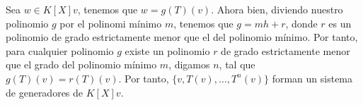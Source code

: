 Sea \(w \in K[X]v\), tenemos que  \(w = g(T)(v)\). Ahora bien, diviendo nuestro polinomio  \(g\) por el polinomi mínimo  \(m\), tenemos que  \(g = mh + r\), donde \(r\) es un polinomio de grado estrictamente menor que el del polinomio mínimo. Por tanto, para cualquier polinomio \(g\) existe un polinomio \(r\) de grado estrictamente menor que el grado del polinomio mínimo \(m\), digamos \(n\), tal que \(g(T)(v) = r(T)(v)\). Por tanto, \(\{v, T(v), \dots, T^n(v)\}\) forman un sistema de generadores de \(K[X]v\).
